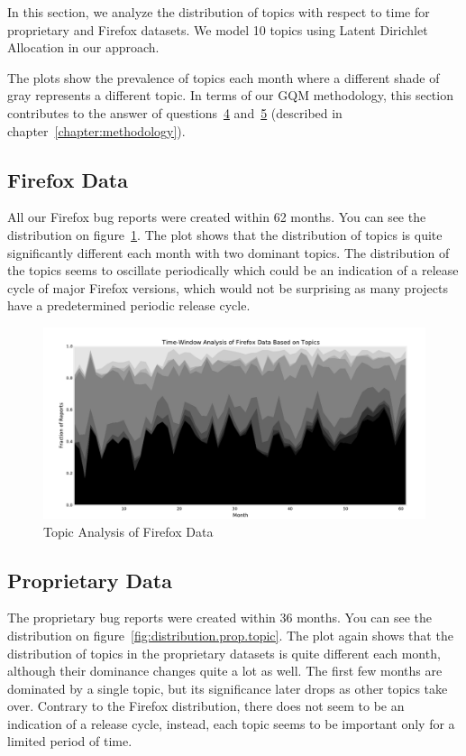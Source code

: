 In this section, we analyze the distribution of topics with respect to time for proprietary and Firefox datasets. We model 10 topics using Latent Dirichlet Allocation in our approach.

The plots show the prevalence of topics each month where a different shade of gray represents a different topic. In terms of our GQM methodology, this section contributes to the answer of questions~\hyperlink{question:4}{4} and~\hyperlink{question:5}{5} (described in chapter~\ref{chapter:methodology}).

\subsection{Firefox Data}

All our Firefox bug reports were created within 62 months. You can see the distribution on figure~\ref{fig:distribution.firefox.topic}. The plot shows that the distribution of topics is quite significantly different each month with two dominant topics. The distribution of the topics seems to oscillate periodically which could be an indication of a release cycle of major Firefox versions, which would not be surprising as many projects have a predetermined periodic release cycle. 

\begin{figure}[htbp]
    \centering
        \includegraphics[width=\textwidth]{./images/topic_component_distribution/firefox_topic_10.pdf}
    \caption{Topic Analysis of Firefox Data}
    \label{fig:distribution.firefox.topic}
\end{figure}

\subsection{Proprietary Data}

The proprietary bug reports were created within 36 months. You can see the distribution on figure~\ref{fig:distribution.prop.topic}. The plot again shows that the distribution of topics in the proprietary datasets is quite different each month, although their dominance changes quite a lot as well. The first few months are dominated by a single topic, but its significance later drops as other topics take over. Contrary to the Firefox distribution, there does not seem to be an indication of a release cycle, instead, each topic seems to be important only for a limited period of time.

